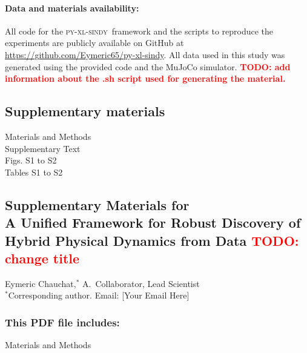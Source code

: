 \documentclass[12pt]{article}
\newcommand{\frameworkname}{\textsc{py-xl-sindy}}
\newcommand{\TODO}[1]{\textbf{\textcolor{red}{\Large TODO: \normalsize #1}}}
\def\scititle{
	A Unified Framework for Robust Discovery of Hybrid Physical Dynamics from Data \TODO{change title}
}
\begin{document}
\paragraph*{Data and materials availability:}
All code for the \frameworkname\ framework and the scripts to reproduce the experiments are publicly available on GitHub at \url{https://github.com/Eymeric65/py-xl-sindy}. All data used in this study was generated using the provided code and the MuJoCo simulator. \TODO{ add information about the .sh script used for generating the material.}


\subsection*{Supplementary materials}
Materials and Methods\\
Supplementary Text\\
Figs. S1 to S2\\
Tables S1 to S2\\



\newpage
\appendix

\renewcommand{\thefigure}{S\arabic{figure}}
\renewcommand{\thetable}{S\arabic{table}}
\renewcommand{\theequation}{S\arabic{equation}}
\renewcommand{\thepage}{S\arabic{page}}
\setcounter{figure}{0}
\setcounter{table}{0}
\setcounter{equation}{0}
\setcounter{page}{1}


\begin{center}
\section*{Supplementary Materials for\\ \scititle}
Eymeric Chauchat,$^{\ast}$ A.~Collaborator, Lead Scientist\\
\small$^\ast$Corresponding author. Email: [Your Email Here]
\end{center}

\subsubsection*{This PDF file includes:}
Materials and Methods

\newpage
\end{document}
